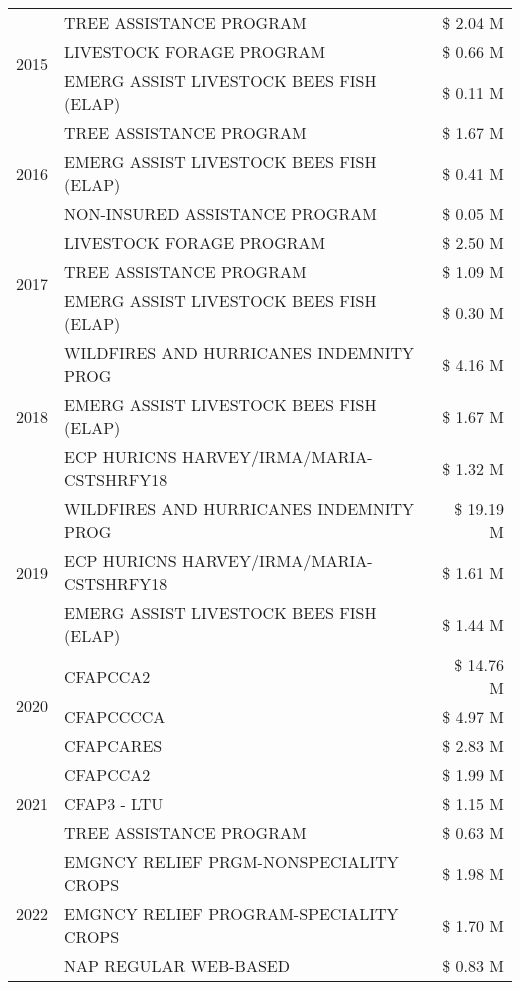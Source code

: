 \begin{tabular}{llr}
\cline{1-3}
\multirow[t]{3}{*}{2015} & TREE ASSISTANCE PROGRAM & \$ 2.04 M \\
 & LIVESTOCK FORAGE PROGRAM & \$ 0.66 M \\
 & EMERG ASSIST LIVESTOCK BEES FISH (ELAP) & \$ 0.11 M \\
\cline{1-3}
\multirow[t]{3}{*}{2016} & TREE ASSISTANCE PROGRAM & \$ 1.67 M \\
 & EMERG ASSIST LIVESTOCK BEES FISH (ELAP) & \$ 0.41 M \\
 & NON-INSURED ASSISTANCE PROGRAM & \$ 0.05 M \\
\cline{1-3}
\multirow[t]{3}{*}{2017} & LIVESTOCK FORAGE PROGRAM & \$ 2.50 M \\
 & TREE ASSISTANCE PROGRAM & \$ 1.09 M \\
 & EMERG ASSIST LIVESTOCK BEES FISH (ELAP) & \$ 0.30 M \\
\cline{1-3}
\multirow[t]{3}{*}{2018} & WILDFIRES AND HURRICANES INDEMNITY PROG & \$ 4.16 M \\
 & EMERG ASSIST LIVESTOCK BEES FISH (ELAP) & \$ 1.67 M \\
 & ECP HURICNS HARVEY/IRMA/MARIA-CSTSHRFY18 & \$ 1.32 M \\
\cline{1-3}
\multirow[t]{3}{*}{2019} & WILDFIRES AND HURRICANES INDEMNITY PROG & \$ 19.19 M \\
 & ECP HURICNS HARVEY/IRMA/MARIA-CSTSHRFY18 & \$ 1.61 M \\
 & EMERG ASSIST LIVESTOCK BEES FISH (ELAP) & \$ 1.44 M \\
\cline{1-3}
\multirow[t]{3}{*}{2020} & CFAPCCA2 & \$ 14.76 M \\
 & CFAPCCCCA & \$ 4.97 M \\
 & CFAPCARES & \$ 2.83 M \\
\cline{1-3}
\multirow[t]{3}{*}{2021} & CFAPCCA2 & \$ 1.99 M \\
 & CFAP3 - LTU & \$ 1.15 M \\
 & TREE ASSISTANCE PROGRAM & \$ 0.63 M \\
\cline{1-3}
\multirow[t]{3}{*}{2022} & EMGNCY RELIEF PRGM-NONSPECIALITY CROPS & \$ 1.98 M \\
 & EMGNCY RELIEF PROGRAM-SPECIALITY CROPS & \$ 1.70 M \\
 & NAP REGULAR WEB-BASED & \$ 0.83 M \\
\cline{1-3}
\bottomrule
\end{tabular}
